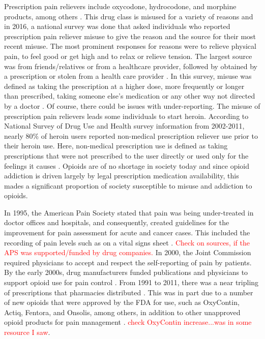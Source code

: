 \documentclass[12pt]{article}
\begin{document}
Prescription pain relievers include oxycodone, hydrocodone, and morphine products, among others \cite{CDC3}. This drug class is misused for a variety of reasons and in 2016, a national survey was done that asked individuals who reported prescription pain reliever misuse to give the reason and the source for their most recent misuse. The most prominent responses for reasons were to relieve physical pain, to feel good or get high and to relax or relieve tension. The largest source was from friends/relatives or from a healthcare provider, followed by obtained by a prescription or stolen from a health care provider \cite{CDC2}. In this survey, misuse was defined as taking the prescription at a higher dose, more frequently or longer than prescribed, taking someone else's medication or any other way not directed by a doctor \cite{SAMSHA3}. Of course, there could be issues with under-reporting. The misuse of prescription pain relievers leads some individuals to start heroin.  According to National Survey of Drug Use and Health survey information from 2002-2011, nearly 80\% of heroin users reported non-medical prescription reliever use prior to their heroin use. Here, non-medical prescription use is defined as taking prescriptions that were not prescribed to the user directly or used only for the feelings it causes \cite{Muhuri}. Opioids are of no shortage in society today and since opioid addiction is driven largely by legal prescription medication availability, this mades a significant proportion of society susceptible to misuse and addiction to opioids. 

In 1995, the American Pain Society stated that pain was being under-treated in doctor offices and hospitals, and consequently, created guidelines for the improvement for pain assessment for acute and cancer cases. This included the recording of pain levels such as on a vital signs sheet \cite{Mandell} \cite{Max}. \textcolor{red}{Check on sources, if the APS was supported/funded by drug companies.} In 2000, the Joint Commission required physicians to accept and respect the self-reporting of pain by patients. By the early 2000s, drug manufacturers funded publications and physicians to support opioid use for pain control \cite{Mandell}. From 1991 to 2011, there was a near tripling of prescriptions that pharmacies distributed \cite{NIDA1}. This was in part due to a number of new opioids that were approved by the FDA for use, such as OxyContin, Actiq, Fentora, and Onsolis, among others, in addition to other unapproved opioid products for pain management \cite{FDA1}. \textcolor{red}{check OxyContin increase...was in some resource I saw}. 
\end{document}
